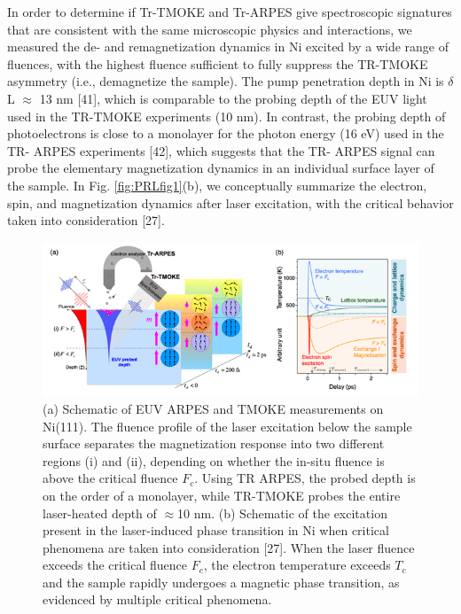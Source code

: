 In order to determine if Tr-TMOKE and Tr-ARPES give spectroscopic signatures that are consistent with the same microscopic physics and interactions, we measured the de- and remagnetization dynamics in Ni excited by a wide range of fluences, with the highest fluence sufficient to fully suppress the TR-TMOKE asymmetry (i.e., demagnetize the sample). The pump penetration depth in Ni is $\delta$L $\approx$ 13 nm [41], which is comparable to the probing depth of the EUV light used in the TR-TMOKE experiments (10 nm). In contrast, the probing depth of photoelectrons is close to a monolayer for the photon energy (16 eV) used in the TR- ARPES experiments [42], which suggests that the TR- ARPES signal can probe the elementary magnetization dynamics in an individual surface layer of the sample. In Fig. \ref{fig:PRLfig1}(b), we conceptually summarize the electron, spin, and magnetization dynamics after laser excitation, with the critical behavior taken into consideration [27].

\begin{figure}
	\label{fig: PRLfig1}
\begin{center}
	\includegraphics[width=150mm]{figs/PRLFig1}
\end{center}
\caption{(a) Schematic of EUV ARPES and TMOKE measurements on Ni(111). The fluence profile of the laser excitation below the sample surface separates the magnetization response into two different regions (i) and (ii), depending on whether the in-situ fluence is above the critical fluence $F_c$. Using TR ARPES, the probed depth is on the order of a monolayer, while TR-TMOKE probes the entire laser-heated depth of $\approx$10 nm. (b) Schematic of the excitation present in the laser-induced phase transition in Ni when critical phenomena are taken into consideration [27]. When the laser fluence exceeds the critical fluence $F_c$, the electron temperature exceeds $T_c$ and the sample rapidly undergoes a magnetic phase transition, as evidenced by multiple critical phenomena.}
\end{figure}

